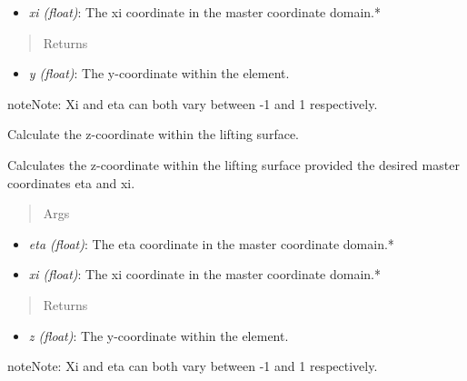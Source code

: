 \documentclass[letterpaper,10pt,english]{sphinxmanual}
\begin{document}
\begin{fulllineitems}
\begin{fulllineitems}
\begin{itemize}
\item {} 
\emph{xi (float)}: The xi coordinate in the master coordinate domain.*

\end{itemize}
\begin{quote}\begin{description}
\item[{Returns}] \leavevmode
\end{description}\end{quote}
\begin{itemize}
\item {} 
\emph{y (float)}: The y-coordinate within the element.

\end{itemize}

\begin{notice}{note}{Note:}
Xi and eta can both vary between -1 and 1 respectively.
\end{notice}

\end{fulllineitems}


\begin{fulllineitems}
\label{aerodynamics:AeroComBAT.Aerodynamics.CAERO1.z}
Calculate the z-coordinate within the lifting surface.

Calculates the z-coordinate within the lifting surface provided the
desired master coordinates eta and xi.
\begin{quote}\begin{description}
\item[{Args}] \leavevmode
\end{description}\end{quote}
\begin{itemize}
\item {} 
\emph{eta (float)}: The eta coordinate in the master coordinate domain.*

\item {} 
\emph{xi (float)}: The xi coordinate in the master coordinate domain.*

\end{itemize}
\begin{quote}\begin{description}
\item[{Returns}] \leavevmode
\end{description}\end{quote}
\begin{itemize}
\item {} 
\emph{z (float)}: The y-coordinate within the element.

\end{itemize}

\begin{notice}{note}{Note:}
Xi and eta can both vary between -1 and 1 respectively.
\end{notice}

\end{fulllineitems}


\end{fulllineitems}
\end{document}
